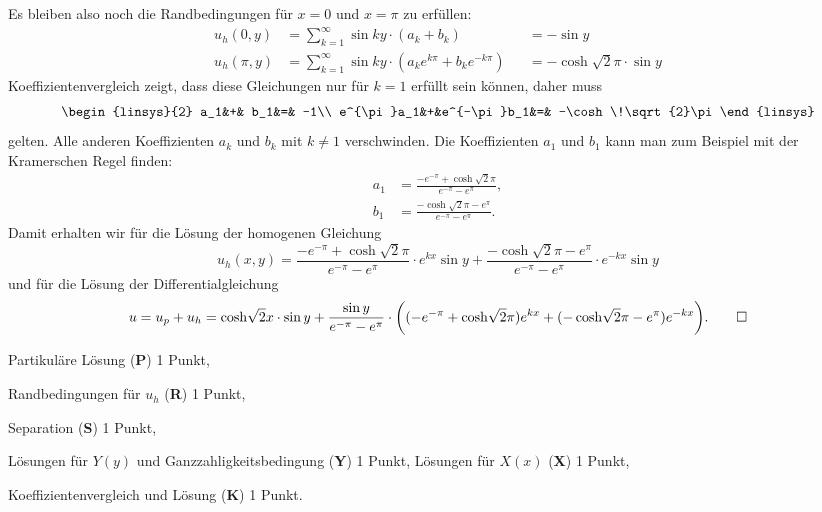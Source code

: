 \begin{loesung}
\begin{teilaufgaben}
Es bleiben also noch die Randbedingungen für $x=0$ und $x=\pi$ zu erfüllen:
\begin{equation}
\begin{aligned}
u_h(0,y)   &= \sum_{k=1}^\infty \sin ky \cdot (a_k + b_k)&&=-\sin y
\\
u_h(\pi,y) &= \sum_{k=1}^\infty \sin ky \cdot (a_ke^{k\pi} + b_ke^{-k\pi}) &&=-\cosh\!\sqrt{2}\pi\cdot \sin y
\end{aligned}
\end{equation}
Koeffizientenvergleich zeigt, dass diese
Gleichungen nur für $k=1$ erfüllt sein können, daher muss
\begin{equation}
\begin{linsys}{2}
       a_1&+&        b_1&=& -1\\
e^{\pi}a_1&+&e^{-\pi}b_1&=& -\cosh\!\sqrt{2}\pi 
\end{linsys}
\end{equation}
gelten.
Alle anderen Koeffizienten $a_k$ und $b_k$ mit $k\ne 1$ verschwinden.
Die Koeffizienten $a_1$ und $b_1$ kann man zum Beispiel mit der Kramerschen
Regel finden:
\begin{align*}
a_1
&=
\frac{-e^{-\pi}+\cosh\!\sqrt{2}\pi}{e^{-\pi}-e^{\pi}},
\\
b_1
&=
\frac{-\cosh\!\sqrt{2}\pi-e^{\pi}}{e^{-\pi}-e^{\pi}}.
\end{align*}
Damit erhalten wir für die Lösung der homogenen Gleichung
\[
u_h(x,y)
=
\frac{-e^{-\pi}+\cosh\!\sqrt{2}\pi}{e^{-\pi}-e^{\pi}}\cdot e^{kx} \sin y
+
\frac{-\cosh\!\sqrt{2}\pi-e^{\pi}}{e^{-\pi}-e^{\pi}}\cdot e^{-kx} \sin y
\]
und für die Lösung der Differentialgleichung
\[
u
=
u_p + u_h
=
\cosh \!\sqrt{2}x\cdot \sin y
+
\frac{ \sin y}{e^{-\pi}-e^{\pi}}
\cdot \biggl(
(-e^{-\pi}+\cosh\!\sqrt{2}\pi) e^{kx}
+
(-\cosh\!\sqrt{2}\pi-e^{\pi}) e^{-kx}
\biggr).
\qedhere
\]
\end{teilaufgaben}
\end{loesung}

\begin{bewertung}
\begin{teilaufgaben}
\item
Partikuläre Lösung ({\bf P}) 1 Punkt,
\item
Randbedingungen für $u_h$ ({\bf R}) 1 Punkt,
\item
Separation ({\bf S}) 1 Punkt,
\item
Lösungen für $Y(y)$ und Ganzzahligkeitsbedingung ({\bf Y}) 1 Punkt,
Lösungen für $X(x)$ ({\bf X}) 1 Punkt,
\item
Koeffizientenvergleich und Lösung ({\bf K}) 1 Punkt.
\end{teilaufgaben}
\end{bewertung}




